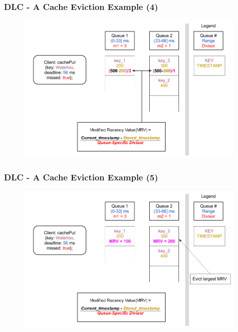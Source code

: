 \documentclass{beamer}
\begin{document}
\begin{frame}
  \frametitle{DLC - A Cache Eviction Example (4)}
  \begin{figure}
    \begin{center}
      \centerline{\includegraphics[scale=0.37]{img/DLC_V8_04.png}}
    \end{center}
  \end{figure}
\end{frame}


\begin{frame}
  \frametitle{DLC - A Cache Eviction Example (5)}
  \begin{figure}
    \begin{center}
      \centerline{\includegraphics[scale=0.37]{img/DLC_V8_05.png}}
    \end{center}
  \end{figure}
\end{frame}
\end{document}

